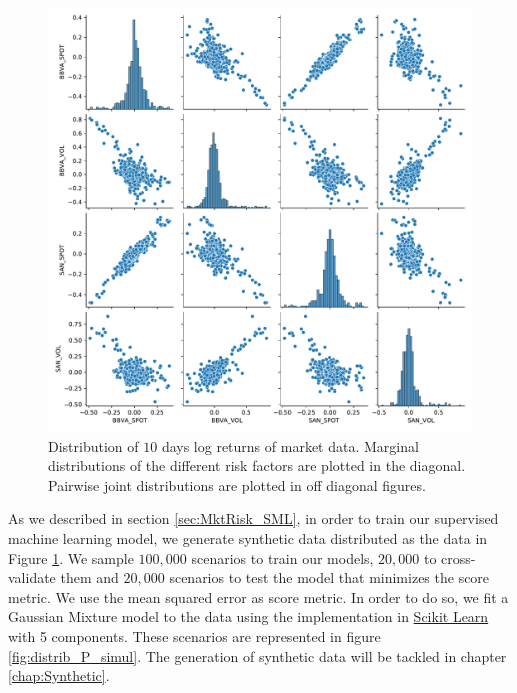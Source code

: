 \begin{figure}[H] 
\centering
\includegraphics[width=1.0\textwidth]{Figures/MarketRisk/histdata.pdf}
\caption{Distribution of $10$ days log returns of market data. Marginal distributions of the different risk factors are plotted in the diagonal. Pairwise joint distributions are plotted in off diagonal figures.}
\label{fig:distrib_P}
\end{figure}

As we described in section \ref{sec:MktRisk_SML}, in order to train our supervised machine learning model, we generate synthetic data distributed as the data in Figure \ref{fig:distrib_P}. We sample $100,000$ scenarios to train our models, $20,000$ to cross-validate them and $20,000$ scenarios to test the model that minimizes the score metric. We use the mean squared error as score metric. In order to do so, we  fit a Gaussian Mixture model to the data using the implementation in \href{https://scikit-learn.org/stable/modules/generated/sklearn.mixture.GaussianMixture.html}{Scikit Learn} with 5 components. These scenarios are represented in figure \ref{fig:distrib_P_simul}. The generation of synthetic data will be tackled in chapter \ref{chap:Synthetic}.


